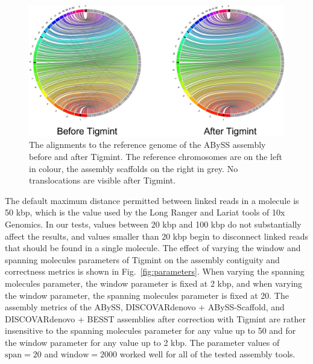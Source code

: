 \documentclass{bmcart}
\begin{document}
\begin{figure}[h!t]
\hypertarget{fig:jupiter}{%
\centering
\includegraphics[width=4.8in]{figures/jupiter.png}
\caption{The alignments to the reference genome of the ABySS assembly before and after Tigmint. The reference chromosomes are on the left in colour, the assembly scaffolds on the right in grey. No translocations are visible after Tigmint.}\label{fig:jupiter}
}
\end{figure}

The default maximum distance permitted between linked reads in a molecule is 50 kbp, which is the value used by the Long Ranger and Lariat tools of 10x Genomics. In our tests, values between 20 kbp and 100 kbp do not substantially affect the results, and values smaller than 20 kbp begin to disconnect linked reads that should be found in a single molecule. The effect of varying the window and spanning molecules parameters of Tigmint on the assembly contiguity and correctness metrics is shown in Fig.~\ref{fig:parameters}. When varying the spanning molecules parameter, the window parameter is fixed at 2 kbp, and when varying the window parameter, the spanning molecules parameter is fixed at 20. The assembly metrics of the ABySS, DISCOVARdenovo + ABySS-Scaffold, and DISCOVARdenovo + BESST assemblies after correction with Tigmint are rather insensitive to the spanning molecules parameter for any value up to 50 and for the window parameter for any value up to 2 kbp. The parameter values of \(\textrm{span} = 20\) and \(\textrm{window} = 2000\) worked well for all of the tested assembly tools.
\end{document}
